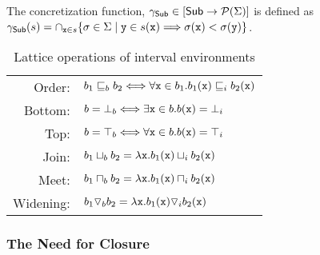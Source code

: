 \documentclass{sig-alternate}
\begin{document}
The concretization function, $\gamma_{\mathsf{Sub}} \in [\mathsf{Sub} \rightarrow\mathcal{P}{(\Sigma)}]$ is defined as $\gamma_{\mathsf{Sub}}(s) = \cap_{\mathtt{x} \in s} \{ \sigma \in \Sigma \mid \mathtt{y} \in s(\mathtt{x}) \Longrightarrow \sigma(\mathtt{x}) < \sigma(\mathtt{y}) \}$.

\begin{table}
\small
\begin{tabular}{rl}
Order:& $ b_1 \sqsubseteq_b b_2 \Longleftrightarrow \forall \mathtt{x} \in b_1. b_1(\mathtt{x}) \sqsubseteq_i b_2(\mathtt{x})$ \\
Bottom:& $ b = {\bot}_b \Longleftrightarrow \exists \mathtt{x} \in b. b(\mathtt{x}) = {\bot}_i$ \\
Top:& $ b = {\top}_b \Longleftrightarrow \forall \mathtt{x} \in b. b(\mathtt{x}) = {\top}_i$\\
Join:& $ b_1 \sqcup_b b_2 = \lambda \mathtt{x}. b_1(\mathtt{x}) \sqcup_i b_2(\mathtt{x}) $ \\
Meet:& $ b_1 \sqcap_b b_2 = \lambda \mathtt{x}. b_1(\mathtt{x}) \sqcap_i b_2(\mathtt{x}) $  \\
Widening:&  $b_1 \triangledown_b b_2 = \lambda \mathtt{x}. b_1(\mathtt{x}) \triangledown_i b_2(\mathtt{x}) $
\end{tabular}
\caption{Lattice operations of interval environments}
\label{tab:boxes}
\end{table}
 

\subsubsection*{The Need for Closure}
\end{document}
